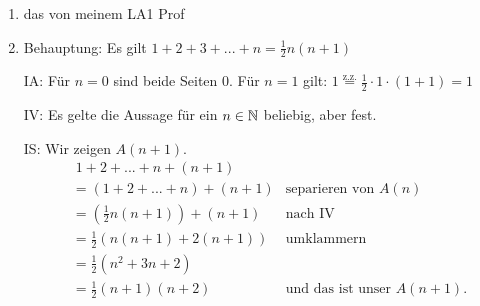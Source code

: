 \begin{example}
    \begin{enumerate}
        \item das von meinem LA1 Prof
        \item Behauptung: Es gilt $1 + 2 + 3 + ... + n = \frac{1}{2} n (n+1)$

        IA: Für $n=0$ sind beide Seiten $0$. Für $n=1$ gilt: $1 \overset{\text{z.z.}}{=} \frac{1}{2} \cdot 1 \cdot (1 + 1) = 1$ \checkmark

        IV: Es gelte die Aussage für ein $n \in \mathbb{N}$ beliebig, aber fest.
        
        IS: Wir zeigen $A(n+1)$.
        \begin{align*}
            & \; 1 + 2 + ... + n + (n+1) & \\
            & = (1 + 2 + ... + n) + (n+1) & \text{separieren von $A(n)$}\\
            & = (\frac{1}{2} n (n+1)) + (n+1) & \text{nach IV}\\
            & = \frac{1}{2} (n (n+1) + 2(n+1)) & \text{umklammern}\\
            & = \frac{1}{2} (n^2 + 3n + 2) & \\
            & = \frac{1}{2} (n+1) (n+2) & \text{und das ist unser $A(n+1)$.}
        \end{align*}
    \end{enumerate}
\end{example}

